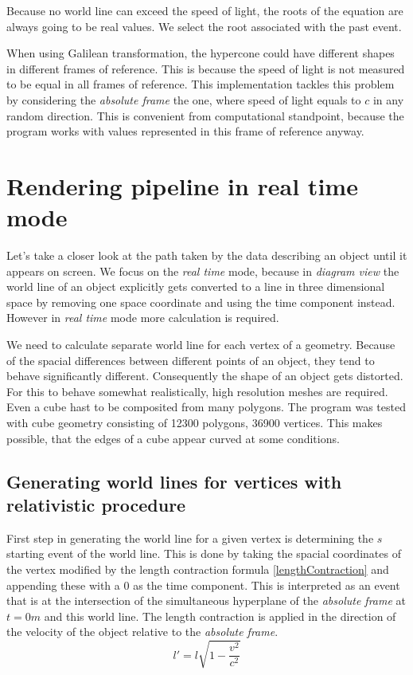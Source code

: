 \documentclass{egpubl}
\begin{document}
Because no world line can exceed the speed of light, the roots of the equation are always going to be real values. We select the root associated with the past event. 

When using Galilean transformation, the hypercone could have different shapes in different frames of reference. This is because the speed of light is not measured to be equal in all frames of reference. This implementation tackles this problem by considering the \emph{absolute frame} the one, where speed of light equals to $c$ in any random direction. This is convenient from computational standpoint, because the program works with values represented in this frame of reference anyway.

\section{Rendering pipeline in real time mode}
Let's take a closer look at the path taken by the data describing an object until it appears on screen. We focus on the \emph{real time} mode, because in \emph{diagram view} the world line of an object explicitly gets converted to a line in three dimensional space by removing one space coordinate and using the time component instead. However in \emph{real time} mode more calculation is required.

We need to calculate separate world line for each vertex of a geometry. Because of the spacial differences between different points of an object, they tend to behave significantly different. Consequently the shape of an object gets distorted. For this to behave somewhat realistically, high resolution meshes are required. Even a cube hast to be composited from many polygons. The program was tested with cube geometry consisting of 12300 polygons, 36900 vertices. This makes possible, that the edges of a cube appear curved at some conditions.

\subsection{Generating world lines for vertices with relativistic procedure}
\label{genRelProc}
First step in generating the world line for a given vertex is determining the $s$ starting event of the world line. This is done by taking the spacial coordinates of the vertex modified by the length contraction formula \ref{lengthContraction} and appending these with a $0$ as the time component. This is interpreted as an event that is at the intersection of the simultaneous hyperplane of the \emph{absolute frame} at $t = 0 m$ and this world line. The length contraction is applied in the direction of the velocity of the object relative to the \emph{absolute frame}.
\begin{equation}
\label{lengthContraction}
l' =l\sqrt{1 - \frac{v^2}{c^2}}
\end{equation}
\end{document}
